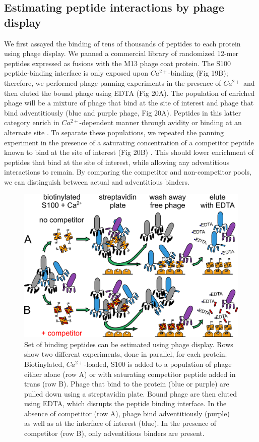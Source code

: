 \subsection{Estimating peptide interactions by phage display}

We first assayed the binding of tens of thousands of peptides to each
protein using phage display. We panned a commercial library of randomized
12-mer peptides expressed as fusions with the M13 phage coat protein.
The S100 peptide-binding interface is only exposed upon $Ca^{2+}$-binding
(Fig 19B); therefore, we performed phage panning experiments in the
presence of $Ca^{2+}$ and then eluted the bound phage using EDTA
(Fig 20A). The population of enriched phage will be a mixture of phage
that bind at the site of interest and phage that bind adventitiously
(blue and purple phage, Fig 20A). Peptides in this latter category
enrich in $Ca^{2+}$-dependent manner through avidity or binding at
an alternate site \citep{sidhu_phage_2000,willats_phage_2002}. To
separate these populations, we repeated the panning experiment in
the presence of a saturating concentration of a competitor peptide
known to bind at the site of interest (Fig 20B) \citep{wheeler_conservation_2017}.
This should lower enrichment of peptides that bind at the site of
interest, while allowing any adventitious interactions to remain.
By comparing the competitor and non-competitor pools, we can distinguish
between actual and adventitious binders. 

\begin{figure}%
\centering
	\includegraphics{ch6-fig2.png} 
\caption[Set of binding peptides can be estimated using phage
display.]{Set of binding peptides can be estimated using phage
display. Rows show two different experiments, done in parallel, for
each protein. Biotinylated, $Ca^{2+}$-loaded, S100 is added to a
population of phage either alone (row A) or with saturating competitor
peptide added in trans (row B). Phage that bind to the protein (blue
or purple) are pulled down using a streptavidin plate. Bound phage
are then eluted using EDTA, which disrupts the peptide binding interface.
In the absence of competitor (row A), phage bind adventitiously (purple)
as well as at the interface of interest (blue). In the presence of
competitor (row B), only adventitious binders are present. \label{samplefigure}}	
\end{figure}

